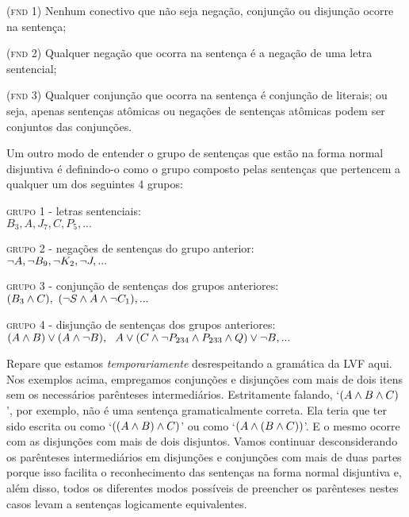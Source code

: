 	\begin{earg}
		\item[(\textsc{fnd 1})] Nenhum conectivo que não seja negação, conjunção ou disjunção ocorre na sentença;
		\item[(\textsc{fnd 2})] Qualquer negação que ocorra na sentença é a negação de uma letra sentencial;
		\item[(\textsc{fnd 3})] Qualquer conjunção que ocorra na sentença é conjunção de literais; ou seja, apenas sentenças atômicas ou negações de sentenças atômicas podem ser conjuntos das conjunções.
	\end{earg}
Um outro modo de entender o grupo de sentenças que estão na forma normal disjuntiva é definindo-o como o grupo composto pelas sentenças que pertencem a qualquer um dos seguintes 4 grupos:
\begin{earg}
		\item[\textsc{grupo 1} - letras sentenciais:] \ \\
				$B_3, A, J_7, C, P_5,...$
		\item[\textsc{grupo 2} - negações de sentenças do grupo anterior:] \ \\
				$\neg A, \neg B_9, \neg K_2, \neg J,... $
		\item[\textsc{grupo 3} - conjunção de sentenças dos grupos anteriores:] \ \\
				$(B_3 \wedge C), \ (\neg S \wedge A \wedge \neg C_1),...$
		\item[\textsc{grupo 4} - disjunção de sentenças dos grupos anteriores:] \ \\ 
				$(A \wedge B) \vee (A \wedge \neg B),\ \  A \vee (C \wedge \neg P_{234} \wedge P_{233} \wedge Q) \vee \neg B,...$
	\end{earg}
Repare que estamos \emph{temporariamente} desrespeitando a gramática da LVF aqui. 
Nos exemplos acima, empregamos conjunções e disjunções com mais de dois itens sem os necessários parênteses intermediários.
Estritamente falando, `$(A \wedge B \wedge C)$', por exemplo, não é uma sentença gramaticalmente correta. Ela teria que ter sido escrita ou como `$((A \wedge B) \wedge C)$' ou como `$(A \wedge (B \wedge C))$'. 
E o mesmo ocorre com as disjunções com mais de dois disjuntos.
Vamos continuar desconsiderando os parênteses intermediários em disjunções e conjunções com mais de duas partes porque isso facilita o reconhecimento das sentenças na forma normal disjuntiva e, além disso, todos os diferentes modos possíveis de preencher os parênteses nestes casos levam a sentenças logicamente equivalentes.

